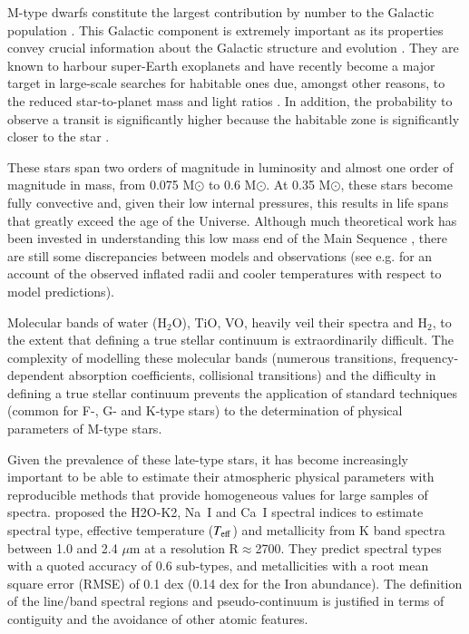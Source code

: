 
M-type dwarfs constitute the largest contribution by number to the
Galactic population \citep{2010AJ....139.2679B}. This Galactic
component is extremely important as its properties convey crucial
information about the Galactic structure and
evolution \citep{2013A&A...556A.110B}. They are known to harbour
super-Earth exoplanets \citep{2013A&A...556A.110B} and have recently
become a major target in large-scale searches for habitable ones due,
amongst other reasons, to the reduced star-to-planet mass and light
ratios \cite{2015A&A...577A.128A}. In addition, the probability to observe a
transit is significantly higher because the habitable zone is
significantly closer to the star \citep{Shields20161}.

These stars span two orders of magnitude in luminosity and almost one
order of magnitude in mass, from 0.075 M$\odot$ to 0.6 M$\odot$. At
0.35 M$\odot$, these stars become fully convective and, given their
low internal pressures, this results in life spans that greatly exceed
the age of the Universe. Although much theoretical work has been
invested in understanding this low mass end of the Main
Sequence \citep{2008ApJ...676.1262B}, there are still some
discrepancies between models and observations (see
e.g. \cite{2013AN....334....4T} for an account of the observed
inflated radii and cooler temperatures with respect to model
predictions).

Molecular bands of water (H$_2$O), TiO, VO,
heavily veil their spectra and H$_2$, to the extent that defining a true stellar
continuum is extraordinarily difficult. The complexity of modelling
these molecular bands (numerous transitions, frequency-dependent
absorption coefficients, collisional transitions) and the difficulty in
defining a true stellar continuum prevents the application of standard
techniques (common for F-, G- and K-type stars) to the determination
of physical parameters of M-type stars.

Given the prevalence of these late-type stars, it has become
increasingly important to be able to estimate their atmospheric
physical parameters with reproducible methods that provide homogeneous
values for large samples of spectra. \cite{2012ApJ...748...93R}
proposed the H2O-K2, Na~{\sc I} and Ca~{\sc I} spectral indices to
estimate spectral type, effective temperature ($T_{\rm eff}$) and
metallicity from K band spectra between 1.0 and 2.4 $\mu$m at a
resolution R$\approx$2700. They predict spectral types with a quoted
accuracy of 0.6 sub-types, and metallicities with a root mean square
error (RMSE) of 0.1 dex (0.14 dex for the Iron abundance). The
definition of the line/band spectral regions and pseudo-continuum is
justified in terms of contiguity and the avoidance of other atomic
features. 

